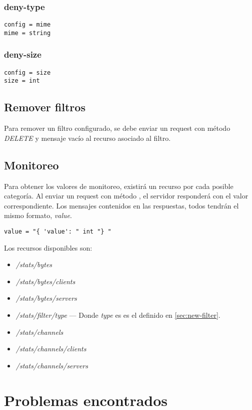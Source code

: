 \documentclass[11pt,a4paper,titlepage]{article}
\begin{document}
\subsubsection{deny-type}
\begin{verbatim}
config = mime
mime = string
\end{verbatim}

\subsubsection{deny-size}
\begin{verbatim}
config = size
size = int
\end{verbatim}

\subsection{Remover filtros}
Para remover un filtro configurado, se debe enviar un request con método \textit{DELETE} y mensaje vacío al recurso asociado al filtro.

\subsection{Monitoreo}
Para obtener los valores de monitoreo, existirá un recurso por cada posible categoría.
Al enviar un request con método , el servidor responderá con el valor correspondiente.
Los mensajes contenidos en las respuestas, todos tendrán el mismo formato, \textit{value}.
\begin{verbatim}
value = "{ 'value': " int "} "
\end{verbatim}

Los recursos disponibles son:
\begin{itemize}
    \item \textit{/stats/bytes}
    \item \textit{/stats/bytes/clients}
    \item \textit{/stats/bytes/servers}
    \item \textit{/stats/filter/type} --- Donde \textit{type} es es el definido en \ref{sec:new-filter}.
    \item \textit{/stats/channels}
    \item \textit{/stats/channels/clients}
    \item \textit{/stats/channels/servers}
\end{itemize}

\section{Problemas encontrados}
\end{document}

